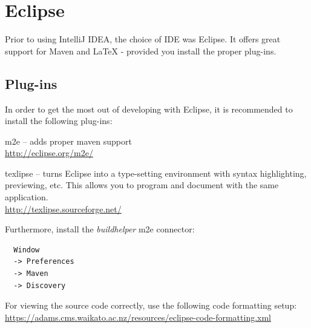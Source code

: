 \clearpage
\section{Eclipse}
Prior to using IntelliJ IDEA, the choice of IDE was Eclipse\cite{eclipse}.
It offers great support for Maven and LaTeX - provided you install the proper
plug-ins.

\subsection{Plug-ins}
In order to get the most out of developing with Eclipse, it is recommended to
install the following plug-ins:
\begin{tight_itemize}
  \item m2e -- adds proper maven support \\
  \url{http://eclipse.org/m2e/}{}
  \item texlipse -- turns Eclipse into a type-setting environment with syntax
  highlighting, previewing, etc. This allows you to program and document with
  the same application. \\
  \url{http://texlipse.sourceforge.net/}{}
\end{tight_itemize}

Furthermore, install the \textit{buildhelper} m2e connector:
\begin{verbatim}
  Window
  -> Preferences
  -> Maven
  -> Discovery
\end{verbatim}

For viewing the source code correctly, use the following code formatting setup: \\
  \url{https://adams.cms.waikato.ac.nz/resources/eclipse-code-formatting.xml}{}

